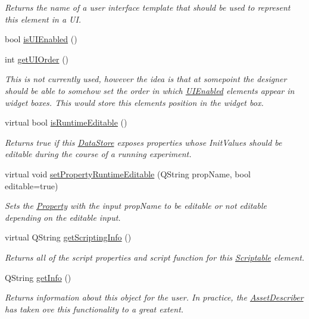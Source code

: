 \begin{DoxyCompactItemize}
\begin{DoxyCompactList}\small\item\em Returns the name of a user interface template that should be used to represent this element in a U\-I. \end{DoxyCompactList}\item 
bool \hyperlink{class_picto_1_1_scriptable_a8f359a1dd735a8a66a5b6a8b76547f4a}{is\-U\-I\-Enabled} ()
\item 
int \hyperlink{class_picto_1_1_scriptable_a4c73838685227f004a22adb18133a07a}{get\-U\-I\-Order} ()
\begin{DoxyCompactList}\small\item\em This is not currently used, however the idea is that at somepoint the designer should be able to somehow set the order in which \hyperlink{class_picto_1_1_u_i_enabled}{U\-I\-Enabled} elements appear in widget boxes. This would store this elements position in the widget box. \end{DoxyCompactList}\item 
virtual bool \hyperlink{class_picto_1_1_scriptable_a250b47e229c0a47fa830aa0e4f89f557}{is\-Runtime\-Editable} ()
\begin{DoxyCompactList}\small\item\em Returns true if this \hyperlink{class_picto_1_1_data_store}{Data\-Store} exposes properties whose Init\-Values should be editable during the course of a running experiment. \end{DoxyCompactList}\item 
virtual void \hyperlink{class_picto_1_1_scriptable_ab738ef884dc8cbd5d28fff4fde5cbca6}{set\-Property\-Runtime\-Editable} (Q\-String prop\-Name, bool editable=true)
\begin{DoxyCompactList}\small\item\em Sets the \hyperlink{class_picto_1_1_property}{Property} with the input prop\-Name to be editable or not editable depending on the editable input. \end{DoxyCompactList}\item 
virtual Q\-String \hyperlink{class_picto_1_1_scriptable_a728180eeacd1b8611eda1540a9dd1a0f}{get\-Scripting\-Info} ()
\begin{DoxyCompactList}\small\item\em Returns all of the script properties and script function for this \hyperlink{class_picto_1_1_scriptable}{Scriptable} element. \end{DoxyCompactList}\item 
Q\-String \hyperlink{class_picto_1_1_scriptable_a0d8664f35c5127e7d5e861306e76c6bf}{get\-Info} ()
\begin{DoxyCompactList}\small\item\em Returns information about this object for the user. In practice, the \hyperlink{class_asset_describer}{Asset\-Describer} has taken ove this functionality to a great extent. \end{DoxyCompactList}\end{DoxyCompactItemize}
